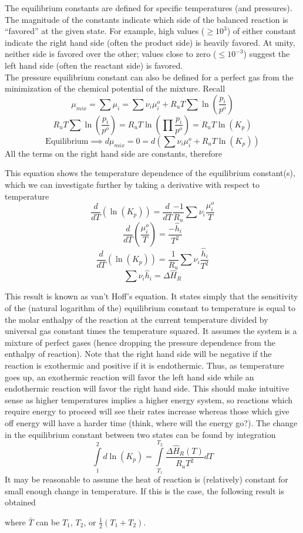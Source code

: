\documentclass[11pt]{article}
\newcommand{\CenteredBoxed}[1]{\begin{center}\boxed{#1}\end{center}}
\newcommand{\intlim}[2]{\int\limits_{#1}^{#2}}
\begin{document}
The equilibrium constants are defined for specific temperatures (and pressures). The magnitude of the constants indicate which side of the balanced reaction is ``favored'' at the given state. For example, high values ($\geq10^3$) of either constant indicate the right hand side (often the product side) is heavily favored. At unity, neither side is favored over the other; values close to zero ($\leq10^{-3}$) suggest the left hand side (often the reactant side) is favored.\\

The pressure equilibrium constant can also be defined for a perfect gas from the minimization of the chemical potential of the mixture. Recall
$$\mu_{mix} = \sum\mu_i=\sum\nu_i\mu_i^o + R_uT\sum\ln\left(\frac{p_i}{p^o}\right)$$
$$R_uT\sum\ln\left(\frac{p_i}{p^o}\right)=R_uT\ln\left(\prod\frac{p_i}{p^o}\right)=R_uT\ln(K_p)$$
$$\mathrm{Equilibrium}\implies d\mu_{mix}=0=d\left(\sum\nu_i\mu_i^o + R_uT\ln(K_p)\right)$$
All the terms on the right hand side are constants, therefore
\CenteredBoxed{\ln(K_p)=\frac{-1}{R_uT}\sum\nu_i\mu_i^o}
This equation shows the temperature dependence of the equilibrium constant(s), which we can investigate further by taking a derivative with respect to temperature
$$\frac{d}{dT}\left(\ln(K_p)\right) = \frac{d}{dT}\frac{-1}{R_u}\sum\nu_i\frac{\mu_i^o}{T}$$
$$\frac{d}{dT}\left(\frac{\mu_i^o}{T}\right) = \frac{-\hat{h}_i}{T^2}$$
$$\frac{d}{dT}\left(\ln(K_p)\right) = \frac{1}{R_u}\sum\nu_i\frac{\hat{h}_i}{T^2}$$
$$\sum\nu_i\hat{h}_i=\Delta\hat{H}_R$$
\CenteredBoxed{\frac{d\ln(K_p)}{dT} = \frac{\Delta\hat{H}_R(T)}{R_uT^2}}
This result is known as van't Hoff's equation. It states simply that the sensitivity of the (natural logarithm of the) equilibrium constant to temperature is equal to the molar enthalpy of the reaction at the current temperature divided by universal gas constant times the temperature squared. It assumes the system is a mixture of perfect gases (hence dropping the pressure dependence from the enthalpy of reaction). Note that the right hand side will be negative if the reaction is exothermic and positive if it is endothermic. Thus, as temperature goes up, an exothermic reaction will favor the left hand side while an endothermic reaction will favor the right hand side. This should make intuitive sense as higher temperatures implies a higher energy system, so reactions which require energy to proceed will see their rates increase whereas those which give off energy will have a harder time (think, where will the energy go?). The change in the equilibrium constant between two states can be found by integration
$$\intlim{1}{2}d\ln(K_p) = \intlim{T_1}{T_2}\frac{\Delta\hat{H}_R(T)}{R_uT^2}dT$$
It may be reasonable to assume the heat of reaction is (relatively) constant for small enough change in temperature. If this is the case, the following result is obtained
\CenteredBoxed{\ln\left(\frac{K_{p,2}}{K_{p,1}}\right) = \frac{\Delta\hat{H}_R(\bar{T})}{R_u}\left(\frac{1}{T_1}-\frac{1}{T_2}\right)}
where $\bar{T}$ can be $T_1$, $T_2$, or $\frac{1}{2}(T_1+T_2)$.\\
\end{document}
